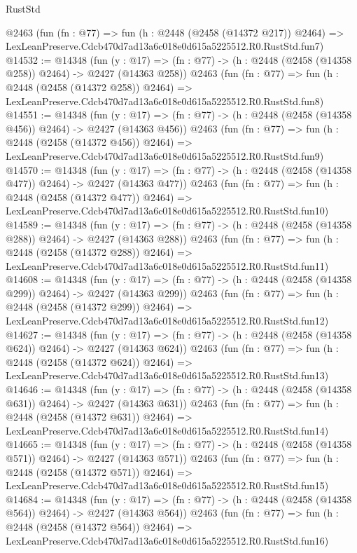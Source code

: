 \begin{lexlean}{RustStd}
\begin{coremodule}
    @2463
    (fun (fn : @77) =>
    fun (h : @2448 (@2458 (@14372 @217)) @2464) =>
    LexLeanPreserve.Cdcb470d7ad13a6c018e0d615a5225512.R0.RustStd.fun7)
@14532 := @14348
    (fun (y : @17) => (fn : @77) -> (h : @2448 (@2458 (@14358 @258)) @2464) -> @2427 (@14363 @258))
    @2463
    (fun (fn : @77) =>
    fun (h : @2448 (@2458 (@14372 @258)) @2464) =>
    LexLeanPreserve.Cdcb470d7ad13a6c018e0d615a5225512.R0.RustStd.fun8)
@14551 := @14348
    (fun (y : @17) => (fn : @77) -> (h : @2448 (@2458 (@14358 @456)) @2464) -> @2427 (@14363 @456))
    @2463
    (fun (fn : @77) =>
    fun (h : @2448 (@2458 (@14372 @456)) @2464) =>
    LexLeanPreserve.Cdcb470d7ad13a6c018e0d615a5225512.R0.RustStd.fun9)
@14570 := @14348
    (fun (y : @17) => (fn : @77) -> (h : @2448 (@2458 (@14358 @477)) @2464) -> @2427 (@14363 @477))
    @2463
    (fun (fn : @77) =>
    fun (h : @2448 (@2458 (@14372 @477)) @2464) =>
    LexLeanPreserve.Cdcb470d7ad13a6c018e0d615a5225512.R0.RustStd.fun10)
@14589 := @14348
    (fun (y : @17) => (fn : @77) -> (h : @2448 (@2458 (@14358 @288)) @2464) -> @2427 (@14363 @288))
    @2463
    (fun (fn : @77) =>
    fun (h : @2448 (@2458 (@14372 @288)) @2464) =>
    LexLeanPreserve.Cdcb470d7ad13a6c018e0d615a5225512.R0.RustStd.fun11)
@14608 := @14348
    (fun (y : @17) => (fn : @77) -> (h : @2448 (@2458 (@14358 @299)) @2464) -> @2427 (@14363 @299))
    @2463
    (fun (fn : @77) =>
    fun (h : @2448 (@2458 (@14372 @299)) @2464) =>
    LexLeanPreserve.Cdcb470d7ad13a6c018e0d615a5225512.R0.RustStd.fun12)
@14627 := @14348
    (fun (y : @17) => (fn : @77) -> (h : @2448 (@2458 (@14358 @624)) @2464) -> @2427 (@14363 @624))
    @2463
    (fun (fn : @77) =>
    fun (h : @2448 (@2458 (@14372 @624)) @2464) =>
    LexLeanPreserve.Cdcb470d7ad13a6c018e0d615a5225512.R0.RustStd.fun13)
@14646 := @14348
    (fun (y : @17) => (fn : @77) -> (h : @2448 (@2458 (@14358 @631)) @2464) -> @2427 (@14363 @631))
    @2463
    (fun (fn : @77) =>
    fun (h : @2448 (@2458 (@14372 @631)) @2464) =>
    LexLeanPreserve.Cdcb470d7ad13a6c018e0d615a5225512.R0.RustStd.fun14)
@14665 := @14348
    (fun (y : @17) => (fn : @77) -> (h : @2448 (@2458 (@14358 @571)) @2464) -> @2427 (@14363 @571))
    @2463
    (fun (fn : @77) =>
    fun (h : @2448 (@2458 (@14372 @571)) @2464) =>
    LexLeanPreserve.Cdcb470d7ad13a6c018e0d615a5225512.R0.RustStd.fun15)
@14684 := @14348
    (fun (y : @17) => (fn : @77) -> (h : @2448 (@2458 (@14358 @564)) @2464) -> @2427 (@14363 @564))
    @2463
    (fun (fn : @77) =>
    fun (h : @2448 (@2458 (@14372 @564)) @2464) =>
    LexLeanPreserve.Cdcb470d7ad13a6c018e0d615a5225512.R0.RustStd.fun16)

\end{coremodule}
\end{lexlean}
